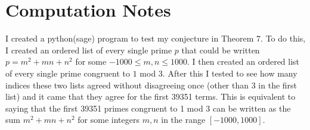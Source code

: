 \documentclass[12pt]{amsart}
\theoremstyle{definition}
\theoremstyle{remark}
\begin{document}
\section*{Computation Notes}
I created a python(sage) program to test my conjecture in Theorem 7. To do this, I created an ordered list of every single prime $p$ that could be written $p=m^2+mn+n^2$ for some $-1000\leq m,n\leq 1000$. I then created an ordered list of every single prime congruent to $1$ mod 3. After this I tested to see how many indices these two lists agreed without disagreeing once (other than 3 in the first list) and it came that they agree for the first 39351 terms. This is equivalent to saying that the first 39351 primes congruent to 1 mod 3 can be written as the sum $m^2+mn+n^2$ for some integers $m,n$ in the range $[-1000,1000]$.
\end{document}
